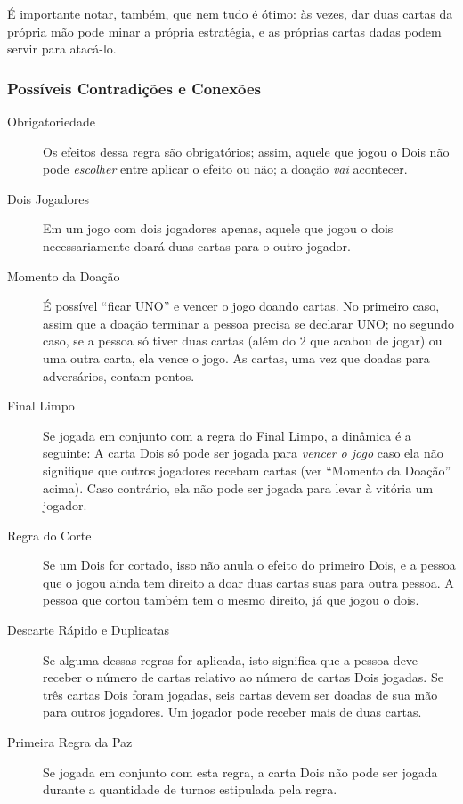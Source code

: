 É importante notar, também, que nem tudo é ótimo: às vezes, dar duas cartas da própria mão pode minar a própria estratégia, e as próprias cartas dadas podem servir para atacá-lo.

\subsubsection{Possíveis Contradições e Conexões}

\begin{description}
\item[Obrigatoriedade]{Os efeitos dessa regra são obrigatórios; assim, aquele que jogou o Dois não pode \emph{escolher} entre aplicar o efeito ou não; a doação \emph{vai} acontecer.}
\item[Dois Jogadores]{Em um jogo com dois jogadores apenas, aquele que jogou o dois necessariamente doará duas cartas para o outro jogador.}
\item[Momento da Doação]{É possível ``ficar UNO'' e vencer o jogo doando cartas. No primeiro caso, assim que a doação terminar a pessoa precisa se declarar UNO; no segundo caso, se a pessoa só tiver duas cartas (além do 2 que acabou de jogar) ou uma outra carta, ela vence o jogo. As cartas, uma vez que doadas para adversários, contam pontos.}
\item[Final Limpo]{Se jogada em conjunto com a regra do Final Limpo, a dinâmica é a seguinte: A carta Dois só pode ser jogada para \emph{vencer o jogo} caso ela não signifique que outros jogadores recebam cartas (ver ``Momento da Doação'' acima). Caso contrário, ela não pode ser jogada para levar à vitória um jogador.}
\item[Regra do Corte]{Se um Dois for cortado, isso não anula o efeito do primeiro Dois, e a pessoa que o jogou ainda tem direito a doar duas cartas suas para outra pessoa. A pessoa que cortou também tem o mesmo direito, já que jogou o dois.}
\item[Descarte Rápido e Duplicatas]{Se alguma dessas regras for aplicada, isto significa que a pessoa deve receber o número de cartas relativo ao número de cartas Dois jogadas. Se três cartas Dois foram jogadas, seis cartas devem ser doadas de sua mão para outros jogadores. Um jogador pode receber mais de duas cartas.}
\item[Primeira Regra da Paz]{Se jogada em conjunto com esta regra, a carta Dois não pode ser jogada durante a quantidade de turnos estipulada pela regra.}
\end{description}

